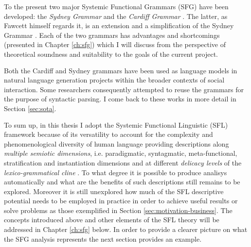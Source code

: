 % 
To the present two major Systemic Functional Grammars (SFG) have been developed: the \textit{Sydney Grammar} \citep{Halliday2013} and the \textit{Cardiff Grammar} \citep{Fawcett2008}. The latter, as Fawcett himself regards it, is an extension and a simplification of the Sydney Grammar \citep[xviii]{Fawcett2008}. Each of the two grammars has advantages and shortcomings (presented in Chapter \ref{ch:sfg}) which I will discuss from the perspective of theoretical soundness and suitability to the goals of the current project.

Both the Cardiff and Sydney grammars have been used as language models in natural language generation projects within the broader contexts of social interaction. Some researchers \citep{Kasper1988, ODonoghue1991a, ODonnell1993, Souter1996, Day2007} consequently attempted to reuse the grammars for the purpose of syntactic parsing.
I come back to these works in more detail in Section \ref{sec:sota}.


To sum up, in this thesis I adopt the Systemic Functional Linguistic (SFL) framework because of its versatility to account for the complexity and phenomenological diversity of human language providing descriptions along \textit{multiple semiotic dimensions}, i.e. paradigmatic, syntagmatic, meta-functional, stratification and instantiation dimensions \citep{Halliday2003} and at different \textit{delicacy levels} of the \textit{lexico-grammatical cline} \citep{Halliday2002, Hasan2014}. To what degree it is possible to produce analisys automatically and what are the benefits of such descriptions still remains to be explored. Moreover it is still unexplored how much of the SFL descriptive potential needs to be employed in practice in order to achieve useful results or solve problems as those exemplified in Section \ref{sec:motivation-business}. The concepts introduced above and other elements of the SFL theory will be addressed in Chapter \ref{ch:sfg} below. In order to provide a clearer picture on what the SFG analysis represents the next section provides an example.


